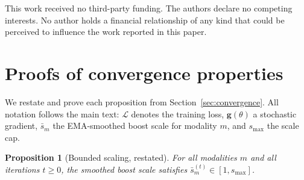 \documentclass{article}
\newtheorem{proposition}{Proposition}
\newcommand{\loss}{\mathcal{L}}
\begin{document}
\begin{ack}
This work received no third-party funding. The authors
declare no competing interests. No author holds a financial relationship of any
kind that could be perceived to influence the work
reported in this paper.
\end{ack}


\newpage





\clearpage
\appendix

\section{Proofs of convergence properties}
\label{app:proofs}

We restate and prove each proposition from Section~\ref{sec:convergence}. All notation follows the main text: $\loss$ denotes the training loss, $\mathbf{g}(\theta)$ a stochastic gradient, $\bar{s}_m$ the EMA-smoothed boost scale for modality $m$, and $s_{\max}$ the scale cap.

\begin{proposition}[Bounded scaling, restated]
For all modalities $m$ and all iterations $t \geq 0$, the smoothed boost scale satisfies $\bar{s}_m^{(t)} \in [1, s_{\max}]$.
\end{proposition}
\end{document}
